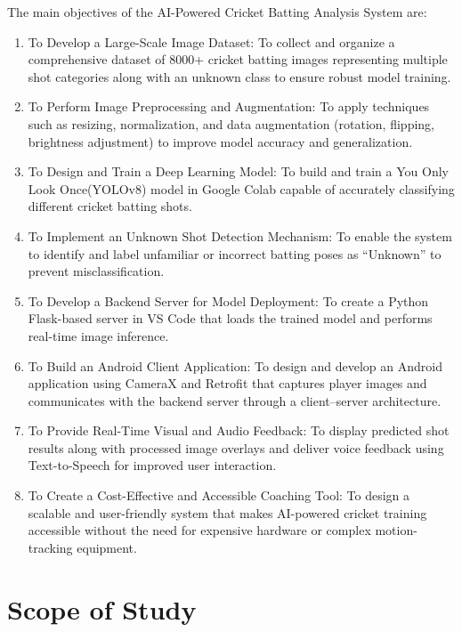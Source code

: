 The main objectives of the AI-Powered Cricket Batting Analysis System are:

\begin{enumerate}
	\item To Develop a Large-Scale Image Dataset:
	To collect and organize a comprehensive dataset of 8000+ cricket batting images representing multiple shot categories along with an unknown class to ensure robust model training.
	
	\item To Perform Image Preprocessing and Augmentation:
	To apply techniques such as resizing, normalization, and data augmentation (rotation, flipping, brightness adjustment) to improve model accuracy and generalization.
	
	\item To Design and Train a Deep Learning Model:
	To build and train a You Only Look Once(YOLOv8) model in Google Colab capable of accurately classifying different cricket batting shots.
	
	\item To Implement an Unknown Shot Detection Mechanism:
	To enable the system to identify and label unfamiliar or incorrect batting poses as “Unknown” to prevent misclassification.
	
	\item To Develop a Backend Server for Model Deployment:
	To create a Python Flask-based server in VS Code that loads the trained model and performs real-time image inference.
	
	\item To Build an Android Client Application:
	To design and develop an Android application using CameraX and Retrofit that captures player images and communicates with the backend server through a client–server architecture.
	
	\item To Provide Real-Time Visual and Audio Feedback:
	To display predicted shot results along with processed image overlays and deliver voice feedback using Text-to-Speech for improved user interaction.
	
	\item To Create a Cost-Effective and Accessible Coaching Tool:
	To design a scalable and user-friendly system that makes AI-powered cricket training accessible without the need for expensive hardware or complex motion-tracking equipment.
\end{enumerate}


\section{Scope of Study} \label{S1.4}

